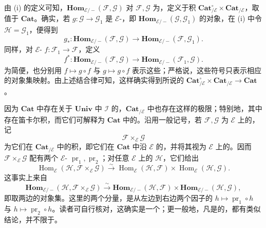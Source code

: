 由 (i) 的定义可知，$\mathbf{Hom}_{\mathcal E/-}(\mathcal F,\mathcal G)$ 对 $\mathcal F,\mathcal G$ 为，定义于积 $\mathbf{Cat}_{/\mathcal E}^{\circ}\times\mathbf{Cat}_{/\mathcal E}$，取值于 $\mathbf{Cat}$。确实，若 $g:\mathcal G\to\mathcal G_1$ 是 $\mathcal E$-，即 $\mathbf{Hom}_{\mathcal E/-}(\mathcal G,\mathcal G_1)$ 的对象，在 (i) 中令 $\mathcal H=\mathcal G_1$，便得到
\[
 g_*:\mathbf{Hom}_{\mathcal E/-}(\mathcal F,\mathcal G)
 \longrightarrow\mathbf{Hom}_{\mathcal E/-}(\mathcal F,\mathcal G_1).
\]
同样，对 $\mathcal E$- $f:\mathcal F_1\to\mathcal F$，定义
\[
 f^*:\mathbf{Hom}_{\mathcal E/-}(\mathcal F,\mathcal G)
 \longrightarrow\mathbf{Hom}_{\mathcal E/-}(\mathcal F_1,\mathcal G).
\]
为简便，也分别用 $f\mapsto g\circ f$ 与 $g\mapsto g\circ f$ 表示这些；严格说，这些符号只表示相应的对象集映射。由上述结合律可知，这样确实得到所说的 $\mathbf{Cat}_{/\mathcal E}^{\circ}\times\mathbf{Cat}_{/\mathcal E}\to\mathbf{Cat}$。

因为 $\mathbf{Cat}$ 中存在关于 $\mathbf{Univ}$ 中 $\mathcal I$ 的，$\mathbf{Cat}_{/\mathcal E}$ 中也存在这样的极限；特别地，其中存在笛卡尔积，而它们可解释为 $\mathbf{Cat}$ 中的。沿用一般记号，若 $\mathcal F,\mathcal G$ 为 $\mathcal E$ 上的，记
\[
 \mathcal F\times_{\mathcal E}\mathcal G
\]
为它们在 $\mathbf{Cat}_{/\mathcal E}$ 中的积，即它们在 $\mathbf{Cat}$ 中沿 $\mathcal E$ 的，并将其视为 $\mathcal E$ 上的。因而 $\mathcal F\times_{\mathcal E}\mathcal G$ 配有两个 $\mathcal E$- $\operatorname{pr}_1,\operatorname{pr}_2$；对任意 $\mathcal E$ 上的 $\mathcal H$，它们给出
\[
 \operatorname{Hom}_{\mathcal E}(\mathcal H,\mathcal F\times_{\mathcal E}\mathcal G)
 \xrightarrow{\sim}\operatorname{Hom}_{\mathcal E}(\mathcal H,\mathcal F)\times
 \operatorname{Hom}_{\mathcal E}(\mathcal H,\mathcal G).
\]
这事实上来自
\[
 \mathbf{Hom}_{\mathcal E/-}(\mathcal H,\mathcal F\times_{\mathcal E}\mathcal G)
 \xrightarrow{\sim}\mathbf{Hom}_{\mathcal E/-}(\mathcal H,\mathcal F)\times
 \mathbf{Hom}_{\mathcal E/-}(\mathcal H,\mathcal G),
\]
即取两边的对象集。这里的两个分量，是从左边到右边两个因子的 $h\mapsto\operatorname{pr}_1\circ h$ 与 $h\mapsto\operatorname{pr}_2\circ h$。读者可自行核对，这确实是一个；更一般地，凡是的，都有类似结论，并不限于。

